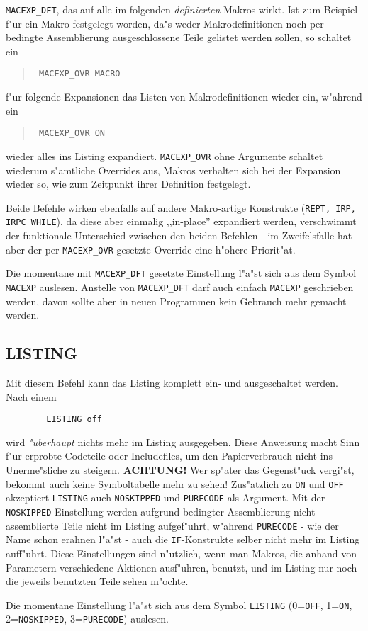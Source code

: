 \documentclass[12pt,a4paper,twoside]{report}
\makeatletter
\newcommand{\ii}[1]{{\it #1}}
\newcommand{\bb}[1]{{\bf #1}}
\newcommand{\tty}[1]{{\tt #1}}
\newcommand{\ttindex}[1]{\index{#1@{\tt #1}}}
\makeatother
\begin{document}
\tty{MACEXP\_DFT}, das auf alle im folgenden {\em definierten} Makros
wirkt.  Ist zum Beispiel f"ur ein Makro festgelegt worden, da"s weder
Makrodefinitionen noch per bedingte Assemblierung ausgeschlossene
Teile gelistet werden sollen, so schaltet ein
\begin{quote}{\tt
	MACEXP\_OVR  MACRO
}\end{quote}
f"ur folgende Expansionen das Listen von Makrodefinitionen wieder ein,
w"ahrend ein
\begin{quote}{\tt
	MACEXP\_OVR ON
}\end{quote}
wieder alles ins Listing expandiert.  \tty{MACEXP\_OVR} ohne
Argumente schaltet wiederum s"amtliche Overrides aus, Makros
verhalten sich bei der Expansion wieder so, wie zum Zeitpunkt ihrer
Definition festgelegt.
\par
Beide Befehle wirken ebenfalls auf andere Makro-artige Konstrukte
(\tty{REPT, IRP, IRPC WHILE}), da diese aber einmalig ,,in-place''
expandiert werden, verschwimmt der funktionale Unterschied zwischen
den beiden Befehlen - im Zweifelsfalle hat aber der per
\tty{MACEXP\_OVR} gesetzte Override eine h"ohere Priorit"at.

Die momentane mit \tty{MACEXP\_DFT} gesetzte Einstellung l"a"st sich
aus dem Symbol \tty{MACEXP} auslesen.  Anstelle von \tty{MACEXP\_DFT}
darf auch einfach \tty{MACEXP} geschrieben werden, davon sollte aber
in neuen Programmen kein Gebrauch mehr gemacht werden.


\subsection{LISTING}
\ttindex{LISTING}

Mit diesem Befehl kann das Listing komplett ein- und ausgeschaltet
werden. Nach einem
\begin{verbatim}
        LISTING off
\end{verbatim}
wird \ii{"uberhaupt} nichts mehr im Listing ausgegeben.  Diese Anweisung
macht Sinn f"ur erprobte Codeteile oder Includefiles, um den
Papierverbrauch nicht ins Unerme"sliche zu steigern.  \bb{ACHTUNG!}
Wer sp"ater das Gegenst"uck vergi"st, bekommt auch keine Symboltabelle
mehr zu sehen!  Zus"atzlich zu \tty{ON} und \tty{OFF} akzeptiert
\tty{LISTING} auch \tty{NOSKIPPED} und \tty{PURECODE} als Argument.  Mit
der \tty{NOSKIPPED}-Einstellung werden aufgrund bedingter Assemblierung
nicht assemblierte Teile nicht im Listing aufgef"uhrt, w"ahrend
\tty{PURECODE} - wie der Name schon erahnen l"a"st - auch die
\tty{IF}-Konstrukte selber nicht mehr im Listing auff"uhrt.  Diese
Einstellungen sind n"utzlich, wenn man Makros, die anhand von
Parametern verschiedene Aktionen ausf"uhren, benutzt, und im Listing
nur noch die jeweils benutzten Teile sehen m"ochte.
\par
Die momentane Einstellung l"a"st sich aus dem Symbol \tty{LISTING}
(0=\tty{OFF}, 1=\tty{ON}, 2=\tty{NOSKIPPED}, 3=\tty{PURECODE}) auslesen.
\end{document}
